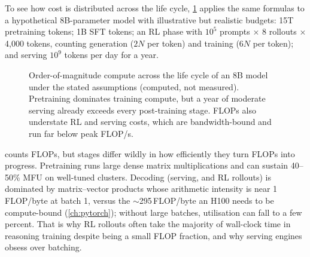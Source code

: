 To see how cost is distributed across the life cycle, \cref{fig:landscape:lifecyclecost} applies the same
formulas to a hypothetical 8B-parameter model with illustrative but realistic budgets: 15T pretraining
tokens; 1B SFT tokens; an RL phase with $10^5$ prompts $\times$ 8 rollouts $\times$ 4{,}000 tokens, counting
generation ($2N$ per token) and training ($6N$ per token); and serving $10^9$ tokens per day for a year.

\begin{figure}[t]
\centering
{}
\caption{Order-of-magnitude compute across the life cycle of an 8B model under the stated assumptions
(computed, not measured). Pretraining dominates training compute, but a year of moderate serving already
exceeds every post-training stage. FLOPs also understate RL and serving costs, which are bandwidth-bound
and run far below peak FLOP/s.}
\label{fig:landscape:lifecyclecost}
\end{figure}

\begin{systemslens}
 counts FLOPs, but stages differ wildly in how efficiently they turn
FLOPs into progress. Pretraining runs large dense matrix multiplications and can sustain 40--50\% MFU on
well-tuned clusters. Decoding (serving, and RL rollouts) is dominated by matrix--vector products whose
arithmetic intensity is near 1\,FLOP/byte at batch 1, versus the $\sim$295\,FLOP/byte an H100 needs to be
compute-bound (\cref{ch:pytorch}); without large batches, utilisation can fall to a few percent. That is
why RL rollouts often take the majority of wall-clock time in reasoning training despite being a small
FLOP fraction, and why serving engines obsess over batching.
\end{systemslens}

